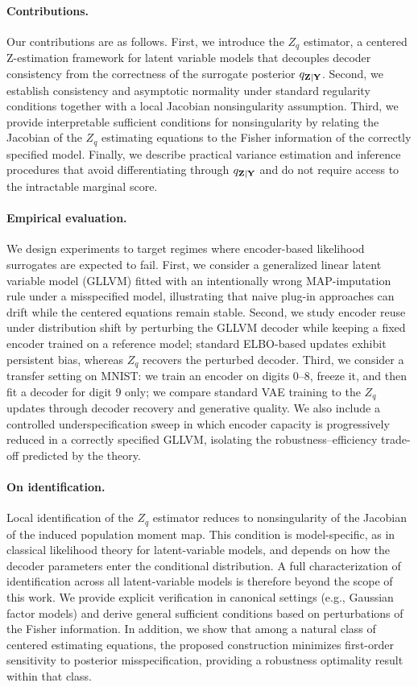\documentclass[twoside,11pt]{article}
\begin{document}
\paragraph{Contributions.}
Our contributions are as follows.
First, we introduce the $Z_q$ estimator, a centered Z-estimation framework for latent variable models that decouples decoder consistency from the correctness of the surrogate posterior $q_{{\bf Z}\mid{\bf Y}}$.
Second, we establish consistency and asymptotic normality under standard regularity conditions together with a local Jacobian nonsingularity assumption.
Third, we provide interpretable sufficient conditions for nonsingularity by relating the Jacobian of the $Z_q$ estimating equations to the Fisher information of the correctly specified model.
Finally, we describe practical variance estimation and inference procedures that avoid differentiating through $q_{{\bf Z}\mid{\bf Y}}$ and do not require access to the intractable marginal score.

\paragraph{Empirical evaluation.}
We design experiments to target regimes where encoder-based likelihood surrogates are expected to fail.
First, we consider a generalized linear latent variable model (GLLVM) fitted with an intentionally wrong MAP-imputation rule under a misspecified model, illustrating that naive plug-in approaches can drift while the centered equations remain stable.
Second, we study encoder reuse under distribution shift by perturbing the GLLVM decoder while keeping a fixed encoder trained on a reference model; standard ELBO-based updates exhibit persistent bias, whereas $Z_q$ recovers the perturbed decoder.
Third, we consider a transfer setting on MNIST: we train an encoder on digits $0$--$8$, freeze it, and then fit a decoder for digit $9$ only; we compare standard VAE training to the $Z_q$ updates through decoder recovery and generative quality.
We also include a controlled underspecification sweep in which encoder capacity is progressively reduced in a correctly specified GLLVM, isolating the robustness--efficiency trade-off predicted by the theory.

\paragraph{On identification.}
Local identification of the $Z_q$ estimator reduces to nonsingularity of the
Jacobian of the induced population moment map.
This condition is model-specific, as in classical likelihood theory for latent-variable models,
and depends on how the decoder parameters enter the conditional distribution.
A full characterization of identification across all latent-variable models
is therefore beyond the scope of this work.
We provide explicit verification in canonical settings (e.g., Gaussian factor models)
and derive general sufficient conditions based on perturbations of the Fisher information.
In addition, we show that among a natural class of centered estimating equations,
the proposed construction minimizes first-order sensitivity to posterior misspecification,
providing a robustness optimality result within that class.
\end{document}
